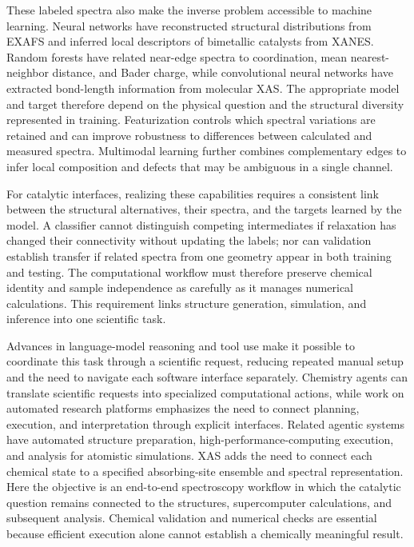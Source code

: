 \documentclass[11pt,a4paper]{article}
\begin{document}
These labeled spectra also make the inverse problem accessible to machine learning. Neural networks have reconstructed structural distributions from EXAFS and inferred local descriptors of bimetallic catalysts from XANES.\cite{timoshenko2018,marcella2020} Random forests have related near-edge spectra to coordination, mean nearest-neighbor distance, and Bader charge,\cite{torrisi2020} while convolutional neural networks have extracted bond-length information from molecular XAS.\cite{david2023} The appropriate model and target therefore depend on the physical question and the structural diversity represented in training. Featurization controls which spectral variations are retained and can improve robustness to differences between calculated and measured spectra.\cite{chen2024} Multimodal learning further combines complementary edges to infer local composition and defects that may be ambiguous in a single channel.\cite{jia2026}

For catalytic interfaces, realizing these capabilities requires a consistent link between the structural alternatives, their spectra, and the targets learned by the model. A classifier cannot distinguish competing intermediates if relaxation has changed their connectivity without updating the labels; nor can validation establish transfer if related spectra from one geometry appear in both training and testing. The computational workflow must therefore preserve chemical identity and sample independence as carefully as it manages numerical calculations. This requirement links structure generation, simulation, and inference into one scientific task.

Advances in language-model reasoning and tool use make it possible to coordinate this task through a scientific request, reducing repeated manual setup and the need to navigate each software interface separately. Chemistry agents can translate scientific requests into specialized computational actions,\cite{bran2024} while work on automated research platforms emphasizes the need to connect planning, execution, and interpretation through explicit interfaces.\cite{canty2023} Related agentic systems have automated structure preparation, high-performance-computing execution, and analysis for atomistic simulations.\cite{vriza2026} XAS adds the need to connect each chemical state to a specified absorbing-site ensemble and spectral representation. Here the objective is an end-to-end spectroscopy workflow in which the catalytic question remains connected to the structures, supercomputer calculations, and subsequent analysis. Chemical validation and numerical checks are essential because efficient execution alone cannot establish a chemically meaningful result.
\end{document}
